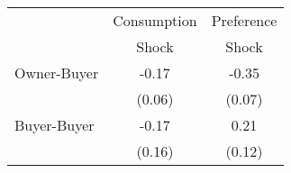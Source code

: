 \begin{tabular}{lcc}
& Consumption & Preference  \\
& Shock & Shock \\
\hline
Owner-Buyer &-0.17&-0.35\\
  & (0.06) & (0.07) \\
Buyer-Buyer &-0.17&0.21\\
 & (0.16) & (0.12) \\
 \hline
\end{tabular}
